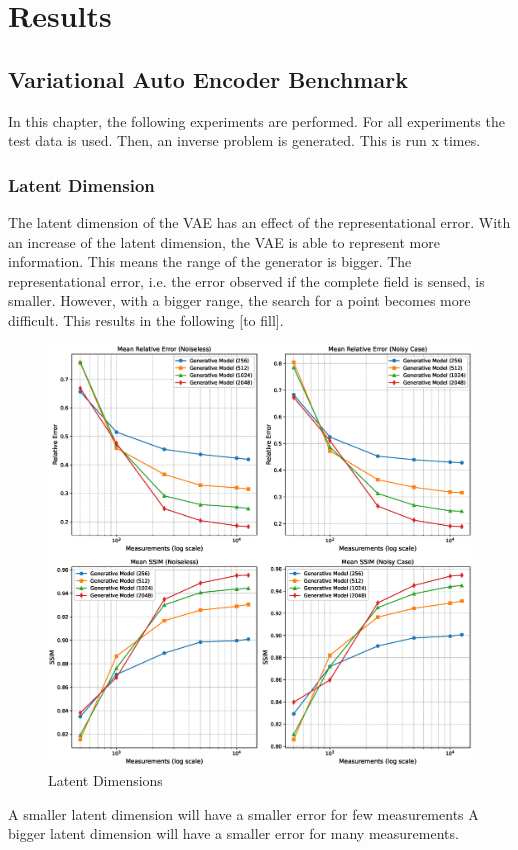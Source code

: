 
\chapter{Results}\label{chapter:results}
\section{Variational Auto Encoder Benchmark}
In this chapter, the following experiments are performed.
For all experiments the test data is used.
Then, an inverse problem is generated.
This is run x times.

\subsection{Latent Dimension}
The latent dimension of the VAE has an effect of the representational error.
With an increase of the latent dimension, the VAE is able to represent more information.
This means the range of the generator is bigger.
The representational error, i.e. the error observed if the complete field is sensed, is smaller.
However, with a bigger range, the search for a point becomes more difficult.
This results in the following [to fill].
\begin{figure}[h!]
    \centering
    \includegraphics[width=\textwidth]{figures/06_results/latent_dimension.eps}
    \caption{Latent Dimensions}
\end{figure}
A smaller latent dimension will have a smaller error for few measurements
A bigger latent dimension will have a smaller error for many measurements.

